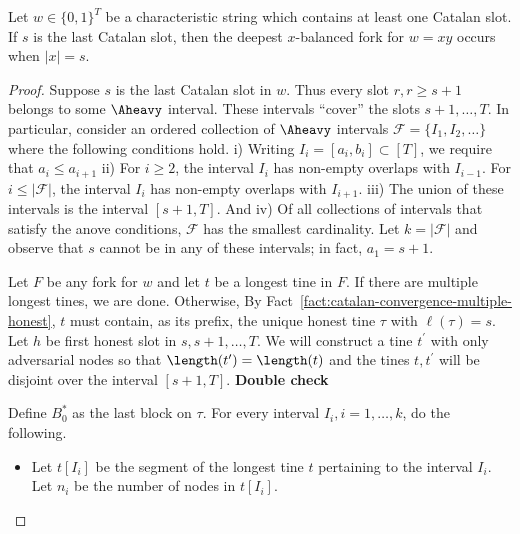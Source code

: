   \begin{fact}\label{fact:catalan-implies-balanced-fork}
    Let $w \in \{0,1\}^T$ be a characteristic string which contains at least one Catalan slot. 
    If $s$ is the last Catalan slot, then 
    the deepest $x$-balanced fork for $w = xy$ 
    occurs when $|x| = s$. 
  \end{fact}
  \begin{proof}
    Suppose $s$ is the last Catalan slot in $w$. 
    Thus every slot $r, r \geq s + 1$ belongs to some $\Aheavy$ interval. 
    These intervals ``cover'' the slots $s + 1, \ldots, T$. 
    In particular,  
    consider an ordered collection of $\Aheavy$ intervals 
    $\mathcal{F} = \{I_1, I_2, \ldots\}$ where 
    the following conditions hold.
    i) Writing $I_i = [a_i, b_i] \subset [T]$, we require that $a _i \leq a_{i + 1}$
    ii) For $i \geq 2$, 
    the interval $I_i$  
    has non-empty overlaps with $I_{i-1}$. 
    For $i \leq |\mathcal{F}|$, 
    the interval $I_i$  
    has non-empty overlaps with $I_{i + 1}$. 
    iii) The union of these intervals is the interval $[s + 1, T]$.
    And iv) Of all collections of intervals that satisfy the anove conditions, 
    $\mathcal{F}$ has the smallest cardinality. 
    Let $k = |\mathcal{F}|$ and observe that 
    $s$ cannot be in any of these intervals; 
    in fact, $a_1 = s + 1$.

    Let $F$ be any fork for $w$ and let $t$ be a longest tine in $F$. 
    If there are multiple longest tines, we are done. 
    Otherwise, 
    By Fact~\ref{fact:catalan-convergence-multiple-honest}, 
    $t$ must contain, as its prefix, the unique honest tine $\tau$ with $\ell(\tau) = s$.
    Let $h$ be first honest slot in $s, s+1, \ldots, T$.
    We will construct a tine $t^\prime$ with only adversarial nodes 
    so that $\length(t^\prime) = \length(t)$ and the tines 
    $t, t^\prime$ will be disjoint over the interval $[s+1, T]$. \textbf{Double check} 
    
    Define $B_0^*$ as the last block on $\tau$.
    For every interval $I_i, i = 1, \ldots, k$, do the following. 
    \begin{itemize}
      \item Let $t[I_i]$ be the segment of the longest tine $t$ 
      pertaining to the interval $I_i$. 
      Let $n_i$ be the number of nodes in $t[I_i]$.


\end{itemize}
\end{proof}
